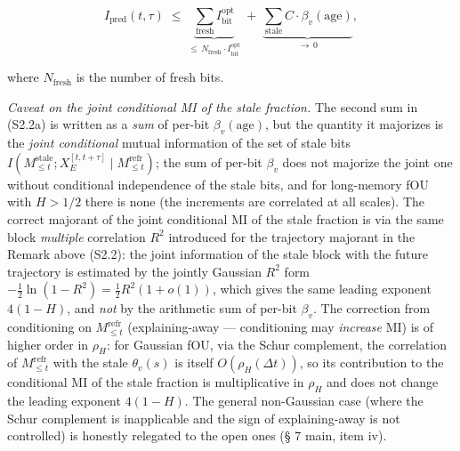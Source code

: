 \documentclass[12pt]{iopart}
\begin{document}
\begin{equation}I_{\text{pred}}(t,\tau) \;\le\; \underbrace{\sum_{\text{fresh}} I^{\text{opt}}_{\text{bit}}}_{\le\, N_{\text{fresh}}\cdot I^{\text{opt}}_{\text{bit}}} \;+\; \underbrace{\sum_{\text{stale}} C\cdot\beta_v(\text{age})}_{\to\, 0}, \tag{S2.2a}\end{equation}



where \(N_{\text{fresh}}\) is the number of fresh bits.



\emph{Caveat on the joint conditional MI of the stale fraction.} The second sum in (S2.2a) is written as a \emph{sum} of per-bit \(\beta_v(\text{age})\), but the quantity it majorizes is the \emph{joint conditional} mutual information of the set of stale bits \(I(M_{\le t}^{\text{stale}}; X_E^{[t,t+\tau]}\mid M_{\le t}^{\text{refr}})\); the sum of per-bit \(\beta_v\) does not majorize the joint one without conditional independence of the stale bits, and for long-memory fOU with \(H > 1/2\) there is none (the increments are correlated at all scales). The correct majorant of the joint conditional MI of the stale fraction is via the same block \emph{multiple} correlation \(R^2\) introduced for the trajectory majorant in the Remark above (S2.2): the joint information of the stale block with the future trajectory is estimated by the jointly Gaussian \(R^2\) form \(-\tfrac12\ln(1-R^2) = \tfrac12 R^2(1+o(1))\), which gives the same leading exponent \(4(1-H)\), and \emph{not} by the arithmetic sum of per-bit \(\beta_v\). The correction from conditioning on \(M_{\le t}^{\text{refr}}\) (explaining-away --- conditioning may \emph{increase} MI) is of higher order in \(\rho_H\): for Gaussian fOU, via the Schur complement, the correlation of \(M_{\le t}^{\text{refr}}\) with the stale \(\theta_v(s)\) is itself \(O(\rho_H(\Delta t))\), so its contribution to the conditional MI of the stale fraction is multiplicative in \(\rho_H\) and does not change the leading exponent \(4(1-H)\). The general non-Gaussian case (where the Schur complement is inapplicable and the sign of explaining-away is not controlled) is honestly relegated to the open ones (§ 7 main, item iv).
\end{document}
